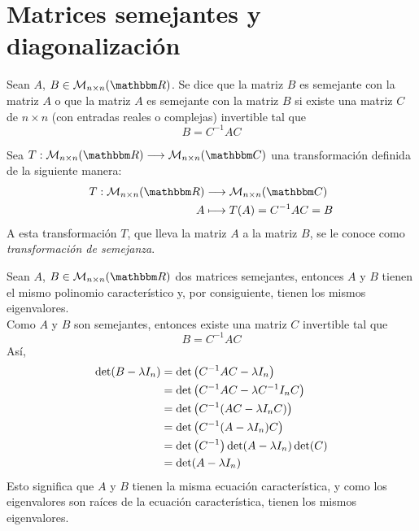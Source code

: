 \section{Matrices semejantes y diagonalización}

\begin{definition}
    Sean $A$, $B \in \mathcal{M}_{n \times n}(\RR)$. Se dice que la matriz $B$ es semejante con la matriz $A$ o que la matriz $A$ es semejante con la matriz $B$ si existe una matriz $C$ de $n \times n$ (con entradas reales o complejas) invertible tal que
    $$B = C^{-1} A C$$
\end{definition}

\begin{definition}
    Sea $T: \mathcal{M}_{n \times n}(\RR) \longrightarrow \mathcal{M}_{n \times n}(\CC)$ una transformación definida de la siguiente manera:
    \begin{align*}
        T: \mathcal{M}_{n \times n}(\RR) & \longrightarrow \mathcal{M}_{n \times n}(\CC) \\
        A & \longmapsto T(A) = C^{-1} A C = B
    \end{align*}
    A esta transformación $T$, que lleva la matriz $A$ a la matriz $B$, se le conoce como \emph{transformación de semejanza}.
\end{definition}

\begin{theorem}
    Sean $A$, $B \in \mathcal{M}_{n \times n}(\RR)$ dos matrices semejantes, entonces $A$ y $B$ tienen el mismo polinomio característico y, por consiguiente, tienen los mismos eigenvalores. \\
    \demostracion Como $A$ y $B$ son semejantes, entonces existe una matriz $C$ invertible tal que
    $$B = C^{-1}AC$$
    Así,
    \begin{align*}
        \operatorname{det}(B - \lambda I_n) & = \operatorname{det}\left(C^{-1}AC - \lambda I_n\right) \\
        & = \operatorname{det}\left(C^{-1}AC - \lambda C^{-1}I_nC\right) \\
        & = \operatorname{det}\left(C^{-1}(AC - \lambda I_nC)\right) \\
        & = \operatorname{det}\left(C^{-1}(A - \lambda I_n)C\right) \\
        & = \operatorname{det}\left(C^{-1}\right) \operatorname{det}(A - \lambda I_n) \operatorname{det}(C) \\
        & = \operatorname{det}(A - \lambda I_n)
    \end{align*}
    Esto significa que $A$ y $B$ tienen la misma ecuación característica, y como los eigenvalores son raíces de la ecuación característica, tienen los mismos eigenvalores.
\end{theorem}

